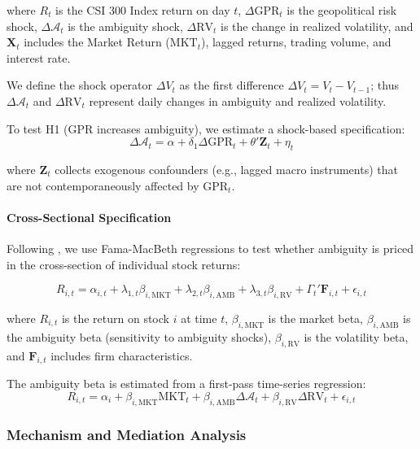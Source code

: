 \documentclass[preprint,12pt,authoryear]{elsarticle}
\begin{document}
where $R_t$ is the CSI 300 Index return on day $t$, $\Delta \text{GPR}_t$ is the geopolitical risk shock, $\Delta \mathcal{A}_t$ is the ambiguity shock, $\Delta \text{RV}_t$ is the change in realized volatility, and $\mathbf{X}_t$ includes the Market Return ($\text{MKT}_t$), lagged returns, trading volume, and interest rate.

We define the shock operator $\Delta V_t$ as the first difference $\Delta V_t = V_t - V_{t-1}$; thus $\Delta \mathcal{A}_t$ and $\Delta \text{RV}_t$ represent daily changes in ambiguity and realized volatility.

To test H1 (GPR increases ambiguity), we estimate a shock-based specification:
\begin{equation}
\Delta \mathcal{A}_{t} = \alpha + \delta_1 \Delta \text{GPR}_{t} + \theta' \mathbf{Z}_{t} + \eta_{t}
\end{equation}

where $\mathbf{Z}_t$ collects exogenous confounders (e.g., lagged macro instruments) that are not contemporaneously affected by $\text{GPR}_t$.

\paragraph{Cross-Sectional Specification}
Following \citet{Fama1992Cross}, we use Fama-MacBeth regressions to test whether ambiguity is priced in the cross-section of individual stock returns:

\begin{equation}
R_{i,t} = \alpha_{i,t} + \lambda_{1,t} \beta_{i,\text{MKT}} + \lambda_{2,t} \beta_{i,\text{AMB}} + \lambda_{3,t} \beta_{i,\text{RV}} + \Gamma_{t}' \mathbf{F}_{i,t} + \epsilon_{i,t}
\end{equation}

where $R_{i,t}$ is the return on stock $i$ at time $t$, $\beta_{i,\text{MKT}}$ is the market beta, $\beta_{i,\text{AMB}}$ is the ambiguity beta (sensitivity to ambiguity shocks), $\beta_{i,\text{RV}}$ is the volatility beta, and $\mathbf{F}_{i,t}$ includes firm characteristics.

The ambiguity beta is estimated from a first-pass time-series regression:
\begin{equation}
R_{i,t} = \alpha_i + \beta_{i,\text{MKT}} \text{MKT}_t + \beta_{i,\text{AMB}} \Delta \mathcal{A}_t + \beta_{i,\text{RV}} \Delta \text{RV}_t + \epsilon_{i,t}
\end{equation}

\subsubsection{Mechanism and Mediation Analysis}
\end{document}
